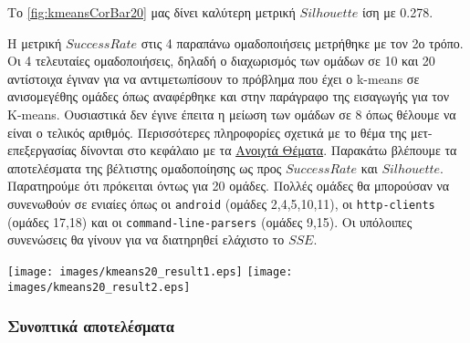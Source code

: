 Το
\hyperref[fig:kmeansCorBar20]{\figurename{} \ref{fig:kmeansCorBar20}}
μας δίνει καλύτερη μετρική $Silhouette$ ίση με 0.278.

Η μετρική $Success Rate$ στις 4 παραπάνω ομαδοποιήσεις μετρήθηκε με τον 2ο τρόπο.
Οι 4 τελευταίες ομαδοποιήσεις, δηλαδή ο διαχωρισμός των ομάδων σε 10 και 20 αντίστοιχα έγιναν για να αντιμετωπίσουν το πρόβλημα που έχει ο k-means σε ανισομεγέθης ομάδες όπως αναφέρθηκε και στην παράγραφο της εισαγωγής για τον K-means. Ουσιαστικά δεν έγινε έπειτα η μείωση των ομάδων σε 8 όπως θέλουμε να είναι ο τελικός αριθμός. Περισσότερες πληροφορίες σχετικά με το θέμα της μετ-επεξεργασίας δίνονται στο κεφάλαιο με τα \hyperref[chapter:openissues]{Ανοιχτά Θέματα}.
Παρακάτω βλέπουμε τα αποτελέσματα της βέλτιστης ομαδοποίησης ως προς $Success Rate$ και $Silhouette$. Παρατηρούμε ότι πρόκειται όντως για 20 ομάδες. Πολλές ομάδες θα μπορούσαν να συνενωθούν σε ενιαίες όπως οι \texttt{android} (ομάδες 2,4,5,10,11), οι \texttt{http-clients} (ομάδες 17,18) και οι \texttt{command-line-parsers} (ομάδες 9,15). Οι υπόλοιπες συνενώσεις θα γίνουν για να διατηρηθεί ελάχιστο το $SSE$.

\noindent\begin{minipage}{\linewidth}
    \centering
    \texttt{[image: images/kmeans20\_result1.eps]}
    \texttt{[image: images/kmeans20\_result2.eps]}
    \label{fig:kmeans20_result}
\end{minipage}

\subsubsection{Συνοπτικά αποτελέσματα}
\begin{table}[htb]
    \centering
    \label{table:best-k-means}
\end{table}

